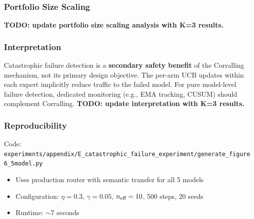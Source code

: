 \subsubsection{Portfolio Size Scaling}

\textbf{TODO: update portfolio size scaling analysis with K=3 results.}

\subsubsection{Interpretation}

Catastrophic failure detection is a \textbf{secondary safety benefit} of the Corralling mechanism, not its primary design objective. The per-arm UCB updates within each expert implicitly reduce traffic to the failed model. For pure model-level failure detection, dedicated monitoring (e.g., EMA tracking, CUSUM) should complement Corralling. \textbf{TODO: update interpretation with K=3 results.}

\subsubsection{Reproducibility}

Code: \texttt{experiments/appendix/E\_catastrophic\_failure\_experiment/generate\_figure6\_5model.py}
\begin{itemize}
    \item Uses production router with semantic transfer for all 5 models
    \item Configuration: $\eta=0.3$, $\gamma=0.05$, $n_{\text{eff}}=10$, 500 steps, 20 seeds
    \item Runtime: $\sim$7 seconds
\end{itemize}
